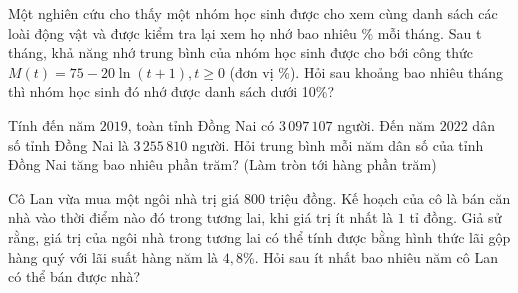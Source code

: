 \begin{bt}%
	Một nghiên cứu cho thấy một nhóm học sinh được cho xem cùng danh sách các loài động vật và được kiểm tra lại xem họ nhớ bao nhiêu \% mỗi tháng. Sau t tháng, khả năng nhớ trung bình của nhóm học sinh được cho bới công thức $M(t)=75-20\ln (t+1 ),t\ge 0$ (đơn vị \%). Hỏi sau khoảng bao nhiêu tháng thì nhóm học sinh đó nhớ được danh sách dưới 10\%?
\end{bt}

\begin{bt}%
	Tính đến năm $2019$, toàn tỉnh Đồng Nai có $3\,097\,107$ người. Đến năm $2022$ dân số tỉnh Đồng Nai là $3\,255\,810$ người. Hỏi trung bình mỗi năm dân số của tỉnh Đồng Nai tăng bao nhiêu phần trăm? (Làm tròn tới hàng phần trăm)
\end{bt}

\begin{bt}%
	Cô Lan vừa mua một ngôi nhà trị giá $800$ triệu đồng. Kế hoạch của cô là bán căn nhà vào thời điểm nào đó trong tương lai, khi giá trị ít nhất là $1$ tỉ đồng. Giả sử rằng, giá trị của ngôi nhà trong tương lai có thể tính được bằng hình thức lãi gộp hàng quý với lãi suất hàng năm là $4{,}8\%$. Hỏi sau ít nhất bao nhiêu năm cô Lan có thể bán được nhà?
\end{bt}

